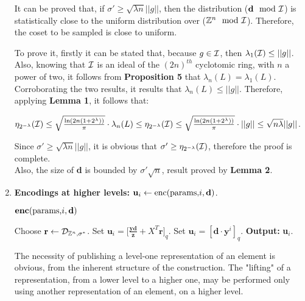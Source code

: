 \begin{enumerate}[label=(\alph*)]
	It can be proved that, if $\sigma' \geq \sqrt{\lambda n}||g||$, then the distribution ($\textbf{d}\mod{\mathcal{I}}$) is statistically close to the uniform distribution over (${\mathbb Z}^n \mod {\mathcal{I}}$). Therefore, the coset to be sampled is close to uniform.
	
	To prove it, firstly it can be stated that, because $g \in \mathcal{I}$, then $\lambda_1(\mathcal{I}) \leq ||g||$. Also, knowing that $\mathcal{I}$ is an ideal of the $(2n)^{th}$ cyclotomic ring, with $n$ a power of two, it follows from \textbf{Proposition 5} that $\lambda_n(L) = \lambda_1(L)$. Corroborating the two results, it results that $\lambda_n(L)\leq ||g||$. Therefore, applying \textbf{Lemma 1}, it follows that:
	
	\begin{center}
		$\eta_{2^{-\lambda}}(\mathcal{I}) \leq \sqrt{\frac{\ln(2n(1 + 2 ^\lambda))}{\pi}} \cdot \lambda_n(L) \leq  \eta_{2^{-\lambda}}(\mathcal{I}) \leq \sqrt{\frac{\ln(2n(1 + 2 ^\lambda))}{\pi}} \cdot ||g|| \leq \sqrt{n\lambda} ||g||$.
	\end{center}

Since $\sigma' \geq \sqrt{\lambda n}||g||$, it is obvious that $\sigma' \geq \eta_{2^{-\lambda}}(\mathcal{I})$, therefore the proof is complete. \\

Also, the size of \textbf{d} is bounded by $\sigma'\sqrt{n}$, result proved by \textbf{Lemma 2}.\\


\item \textbf{Encodings at higher levels:} $\textbf{u}_i \leftarrow \text{enc(params,}i, \textbf{d})$.

	\begin{tcolorbox}[colframe=black,colback=white,arc=0pt,outer arc=0pt]
	\begin{center}
		$\text{\textbf{enc}(params,}i, \textbf{d})$
	\end{center}
	\begin{algorithmic}[1]
		\State Choose $\textbf{r}\leftarrow \mathcal{D}_{{\mathbb Z}^n, \sigma^*}$.
		\State Set $\textbf{u}_i = \big[ \frac{\textbf{yd}}{\textbf{z}} + X^T\textbf{r}\big]_q$.
		\Else
		\State Set $\textbf{u}_i = [\textbf{d}\cdot \textbf{y}^i]_q$.
		\State \textbf{Output:} \textbf{u}$_i$.
		\EndIf
	\end{algorithmic}
\end{tcolorbox}

The necessity of publishing a level-one representation of an element is obvious, from the inherent structure of the construction. The "lifting" of a representation, from a lower level to a higher one, may be performed only using another representation of an element, on a higher level.\\


\end{enumerate}

